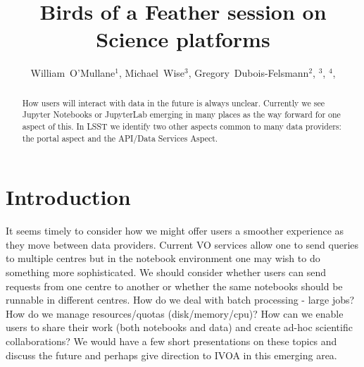 \documentclass[11pt,twoside]{article}
\begin{document}
\title{Birds of a Feather session on Science platforms}

\author{William~O'Mullane$^1$,
Michael~Wise$^3$,
Gregory~Dubois-Felsmann$^2$,
$^3$,
$^4$,
}


\begin{abstract}
How users will interact with data in the future is always unclear.  Currently we see Jupyter Notebooks or JupyterLab emerging in many places as the way forward for one aspect of this.  In LSST we identify two other aspects common to many data providers: the portal aspect and the API/Data Services Aspect.

\end{abstract}

\section{Introduction}

It seems timely to consider how we might offer users a smoother experience as they move between data providers.
Current VO services allow one to send queries to multiple centres but in the notebook environment one may wish to do something more sophisticated. We should consider whether users can send requests from one centre to another or whether the same notebooks should be runnable in different centres.
How do we deal with batch processing - large jobs? How do we manage resources/quotas (disk/memory/cpu)?  How can we enable users to share their work (both notebooks and data) and create ad-hoc scientific collaborations?
We would have a few short presentations on these topics and discuss the future and perhaps give direction to IVOA in this emerging area.
\end{document}
